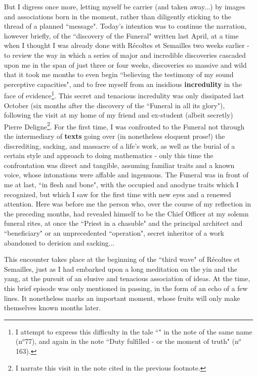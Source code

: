 But I digress once more, letting myself be carrier (and taken away...) by images and associations born in the moment, rather than diligently sticking to the thread of a planned ``message". Today's intention was to continue the narration, however briefly, of the ``discovery of the Funeral"
 written last April, at a time when I thought I was already done with R\'ecoltes et Semailles two weeks earlier - to review the way in which a series of major and incredible discoveries cascaded upon me in the span of just three or four weeks, discoveries so massive and wild that it took me months to even begin ``believing the testimony of my sound perceptive capacities", and to free myself from an insidious \textbf{incredulity} in the face of evidence\footnote{I attempt to express this difficulty in the tale 
 ``"
 in the note of the same name (n$^o$77), and again in the note ``Duty fulfilled - or the moment of truth" (n$^o$163).
}. This secret and tenacious incredulity was only dissipated last October (six months after the discovery of the ``Funeral in all its glory"),
following the visit at my home of my friend and ex-student (albeit secretly) Pierre Deligne\footnote{I narrate this visit in the note cited in the previous footnote.}. For the first time, I was confronted to the Funeral not through the intermediary of \textbf{texts} going over (in nonetheless eloquent prose!) the discrediting, sacking, and massacre of a life's work, as well as the burial of a certain style and approach to doing mathematics - only this time the confrontation was direct and tangible, assuming familiar traits and a known voice, whose intonations were affable and ingenuous. The Funeral was in front of me at last, ``in flesh and bone", with the occupied and anodyne traits which I recognized, but which I saw for the first time with new eyes and a renewed attention. Here was before me the person who, over the course of my reflection in the preceding months, had revealed himself to be the Chief Officer at my solemn funeral rites, at once the ``Priest in a chasuble" and the principal architect and ``beneficiary" or an unprecedented ``operation", secret inheritor of a work abandoned to derision and sacking...

This encounter takes place at the beginning of the ``third wave" of R\'ecoltes et Semailles, just as I had embarked upon a long meditation on the yin and the yang, at the pursuit of an elusive and tenacious association of ideas. At the time, this brief episode was only mentioned in passing, in the form of an echo of a few lines. It nonetheless marks an important moment, whose fruits will only make themselves known months later.

